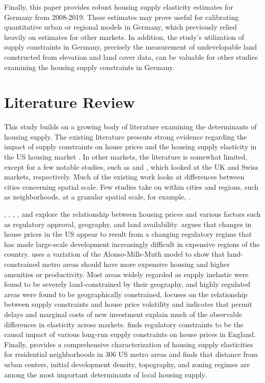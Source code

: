 \documentclass[
  12pt,
]{article}
\begin{document}
Finally, this paper provides robust housing supply elasticity estimates
for Germany from 2008-2019. These estimates may prove useful for
calibrating quantitative urban or regional models in Germany, which
previously relied heavily on estimates for other markets. In addition,
the study's utilization of supply constraints in Germany, precisely the
measurement of undevelopable land constructed from elevation and land
cover data, can be valuable for other studies examining the housing
supply constraints in Germany.

\section{Literature Review}\label{literature-review}

This study builds on a growing body of literature examining the
determinants of housing supply. The existing literature presents strong
evidence regarding the impact of supply constraints on house prices and
the housing supply elasticity in the US housing market
\citep{glaeser_gyourko_2005, saiz_2010, paciorek_2013, baum-snow_han_2019}.
In other markets, the literature is somewhat limited, except for a few
notable studies, such as \citet{hilber_vermeulen_2016} and
\citet{buchler_etal_2021}, which looked at the UK and Swiss markets,
respectively. Much of the existing work looks at differences between
cities concerning spatial scale. Few studies take on within cities and
regions, such as neighborhoods, at a granular spatial scale, for
example, \citet{baum-snow_han_2019}.

\citet{glaeser_gyourko_2005}, \citet{saiz_2010}, \citet{paciorek_2013},
\citet{hilber_vermeulen_2016}, and \citet{baum-snow_han_2019} explore
the relationship between housing prices and various factors such as
regulatory approval, geography, and land availability.
\citet{glaeser_gyourko_2005} argues that changes in house prices in the
US appear to result from a changing regulatory regime that has made
large-scale development increasingly difficult in expensive regions of
the country. \citet{saiz_2010} uses a variation of the Alonso-Mills-Muth
model to show that land-constrained metro areas should have more
expensive housing and higher amenities or productivity. Most areas
widely regarded as supply inelastic were found to be severely
land-constrained by their geography, and highly regulated areas were
found to be geographically constrained. \citet{paciorek_2013} focuses on
the relationship between supply constraints and house price volatility
and indicates that permit delays and marginal costs of new investment
explain much of the observable differences in elasticity across markets.
\citet{hilber_vermeulen_2016} finds regulatory constraints to be the
causal impact of various long-run supply constraints on house prices in
England. Finally, \citet{baum-snow_han_2019} provides a comprehensive
characterization of housing supply elasticities for residential
neighborhoods in 306 US metro areas and finds that distance from urban
centers, initial development density, topography, and zoning regimes are
among the most important determinants of local housing supply.
\end{document}

